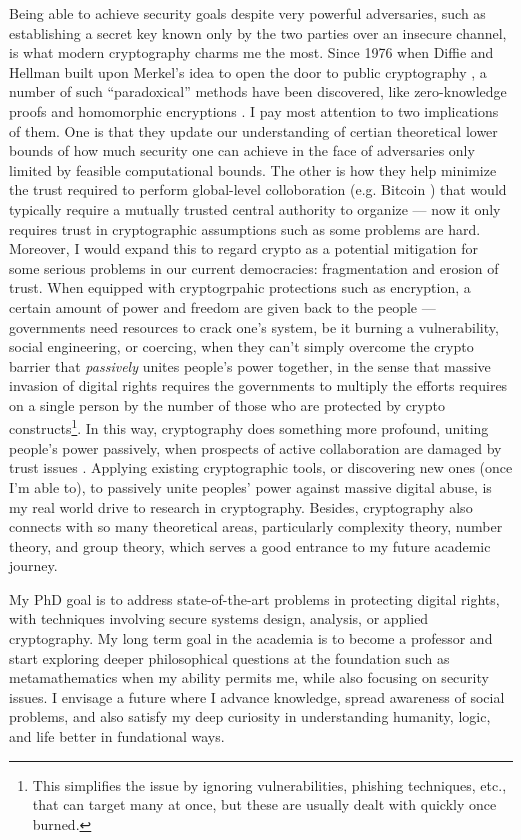 \documentclass[10pt]{article}
\begin{document}
Being able to achieve security goals despite very powerful adversaries, such as
establishing a secret key known only by the two parties over an insecure
channel, is what modern cryptography charms me the most. Since 1976 when Diffie
and Hellman built upon Merkel's idea to open the door to public cryptography
\cite{new.directions.crypto}, a number of such ``paradoxical'' methods have
been discovered, like zero-knowledge proofs \cite{zero.knowledge,
zero.knowledge.np} and homomorphic encryptions \cite{first.full.homo}. I pay
most attention to two implications of them. One is that they update our
understanding of certian theoretical lower bounds of how much security one can
achieve in the face of adversaries only limited by feasible computational
bounds. The other is how they help minimize the trust required to perform
global-level colloboration (e.g. Bitcoin \cite{bitcoin}) that would typically
require a mutually trusted central authority to organize --- now it only
requires trust in cryptographic assumptions such as some problems are hard.
Moreover, I would expand this to regard crypto as a potential mitigation for
some serious problems in our current democracies: fragmentation and erosion of
trust. When equipped with cryptogrpahic protections such as encryption, a
certain amount of power
and freedom are given back to the people --- governments need resources to
crack one's system, be it burning a vulnerability, social engineering, or
coercing, when they can't simply overcome the crypto barrier that
\emph{passively} unites people's power together, in the sense that massive
invasion of digital rights requires the governments to multiply the efforts
requires on a single person by the number of those who are protected by crypto
constructs\footnote{This simplifies the issue by ignoring vulnerabilities,
	phishing techniques, etc., that can target many at once, but these are
usually dealt with quickly once burned.}. In this way, cryptography does
something more profound, uniting people's power passively, when prospects of
active collaboration are damaged by trust issues \cite{trust.book.fukuyama,
how.democracies.die}. Applying existing cryptographic tools, or discovering new
ones (once I'm able to), to passively unite peoples' power against massive
digital abuse, is my real world drive to research in cryptography. Besides,
cryptography also connects with so many theoretical areas, particularly
complexity theory, number theory, and group theory, which serves a good
entrance to my future academic journey.

My PhD goal is to address state-of-the-art problems in protecting digital
rights, with techniques involving secure systems design, analysis, or applied
cryptography. My long term goal in the academia is to become a professor and
start exploring deeper philosophical questions at the foundation such as
metamathematics when my ability permits me, while also focusing on security
issues. I envisage a future where I advance knowledge, spread awareness of
social problems, and also satisfy my deep curiosity in understanding humanity,
logic, and life better in fundational ways.




\end{document}
